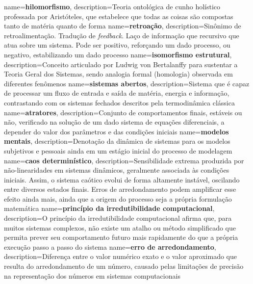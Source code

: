 {
    name=\textbf{hilomorfismo},
    description={Teoria ontológica de cunho holístico professada por Aristóteles, que estabelece que todas as coisas são compostas tanto de matéria quanto de forma}
}
{
    name=\textbf{retroação},
    description={Sinônimo de retroalimentação. Tradução de \textit{feedback}. Laço de informação que recursivo que atua sobre um sistema. Pode ser positivo, reforçando um dado processo, ou negativo, estabilizando um dado processo}
}
{
    name=\textbf{isomorfismo estrutural},
    description={Conceito articulado por Ludwig von Bertalanffy para sustentar a Teoria Geral dos Sistemas, sendo analogia formal (homologia) observada em diferentes fenômenos}
}
{
    name=\textbf{sistemas abertos},
    description={Sistema que é capaz de processar um fluxo de entrada e saída de matéria, energia e informação, contrastando com os sistemas fechados descritos pela termodinâmica clássica}
}
{
    name=\textbf{atratores},
    description={Conjunto de comportamentos finais, estáveis ou não, verificado na solução de um dado sistema de equações diferenciais, a depender do valor dos parâmetros e das condições iniciais}
}
{
    name=\textbf{modelos mentais},
    description={Denotação da dinâmica de sistemas para os modelos subjetivos e pessoais ainda em um estágio inicial do processo de modelagem}
}
{
    name=\textbf{caos determinístico},
    description={Sensibilidade extrema produzida por não-linearidades em sistemas dinâmicos, geralmente associada às condições iniciais. Assim, o sistema caótico evolui de forma altamente instável, oscilando entre diversos estados finais. Erros de arredondamento podem amplificar esse efeito ainda mais, ainda que a origem do processo seja a própria formulação matemática}
}
{
    name=\textbf{princípio da irredutibilidade computacional},
    description={O princípio da irredutibilidade computacional afirma que, para muitos sistemas complexos, não existe um atalho ou método simplificado que permita prever seu comportamento futuro mais rapidamente do que a própria execução passo a passo do sistema}
}
{
    name=\textbf{erro de arredondamento},
    description={Diferença entre o valor numérico exato e o valor aproximado que resulta do arredondamento de um número, causado pelas limitações de precisão na representação dos números em sistemas computacionais}
}
